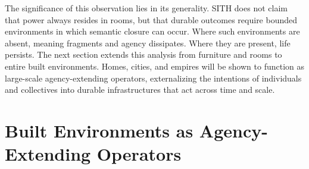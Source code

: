 \documentclass[11pt,oneside]{article}
\begin{document}
The significance of this observation lies in its generality. SITH does not claim that power always resides in rooms, but that durable outcomes require bounded environments in which semantic closure can occur. Where such environments are absent, meaning fragments and agency dissipates. Where they are present, life persists.
The next section extends this analysis from furniture and rooms to entire built environments. Homes, cities, and empires will be shown to function as large-scale agency-extending operators, externalizing the intentions of individuals and collectives into durable infrastructures that act across time and scale.

\section{Built Environments as Agency-Extending Operators}
\end{document}
